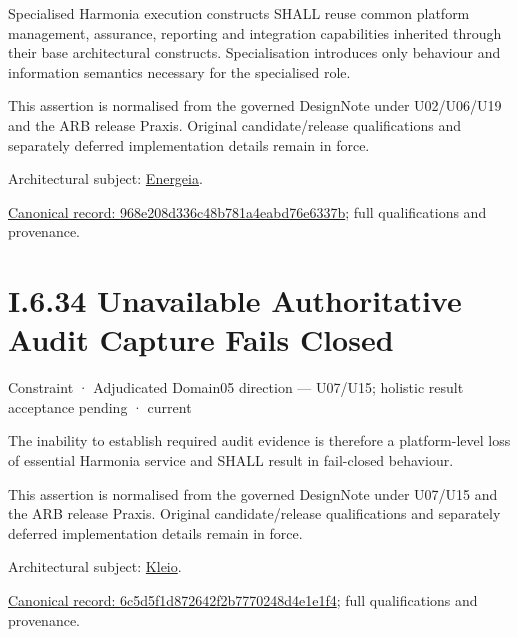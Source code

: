 Specialised Harmonia execution constructs SHALL reuse common platform management, assurance, reporting and integration capabilities inherited through their base architectural constructs. Specialisation introduces only behaviour and information semantics necessary for the specialised role.



This assertion is normalised from the governed DesignNote under U02/U06/U19 and the ARB release Praxis. Original candidate/release qualifications and separately deferred implementation details remain in force.



Architectural subject: \hyperref[element:fb3f37a6ac614415ac486a6de9d35994]{Energeia}.


{\footnotesize \href{../../../../../../../continuum/motivation/constraint/968e208d336c48b781a4eabd76e6337b.md}{Canonical record: 968e208d336c48b781a4eabd76e6337b}; full qualifications and provenance.}\par
\section*{I.6.34 Unavailable Authoritative Audit Capture Fails Closed}
\label{navigation:I.6.34}

\label{element:6c5d5f1d872642f2b7770248d4e1e1f4}
{\small Constraint · Adjudicated Domain05 direction — U07/U15; holistic result acceptance pending · current}\par

The inability to establish required audit evidence is therefore a platform-level loss of essential Harmonia service and SHALL result in fail-closed behaviour.



This assertion is normalised from the governed DesignNote under U07/U15 and the ARB release Praxis. Original candidate/release qualifications and separately deferred implementation details remain in force.



Architectural subject: \hyperref[element:fefda110e2274884ad58906733606efd]{Kleio}.


{\footnotesize \href{../../../../../../../continuum/motivation/constraint/6c5d5f1d872642f2b7770248d4e1e1f4.md}{Canonical record: 6c5d5f1d872642f2b7770248d4e1e1f4}; full qualifications and provenance.}\par
